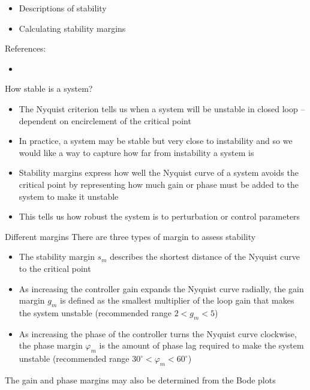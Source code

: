 \documentclass{beamer-control}
\begin{document}

\begin{SUMMARY}
\begin{itemize}
\item Descriptions of stability
\item Calculating stability margins
\end{itemize}
\vfill References:
\begin{itemize}
\item {}
\end{itemize}
\end{SUMMARY}




\begin{frame}{How stable is a system?}
\begin{itemize}
\item The Nyquist criterion tells us when a system will be unstable in closed loop -- dependent on encirclement of the critical point
\item In practice, a system may be stable but very close to instability and so we would like a way to capture how far from instability a system is
\item Stability margins express how well the Nyquist curve of a system avoids the critical point by representing how much gain or phase must be added to the system to make it unstable
\item This tells us how robust the system is to perturbation or control parameters
\end{itemize}
\end{frame}



\begin{frame}{Different margins}
There are three types of margin to assess stability
\begin{itemize}
	\item The stability margin $s_m$ describes the shortest distance of the Nyquist curve to the critical point
	\item As increasing the controller gain expands the Nyquist curve radially, the gain margin $g_m$ is defined as the smallest multiplier of the loop gain that makes the system unstable (recommended range $2<g_m<5$)
	\item As increasing the phase of the controller turns the Nyquist curve clockwise, the phase margin $\varphi_m$ is the amount of phase lag required to make the system unstable (recommended range $30^\circ < \varphi_m < 60^\circ$)
\end{itemize}
The gain and phase margins may also be determined from the Bode plots
	
\end{frame}
\end{document}
